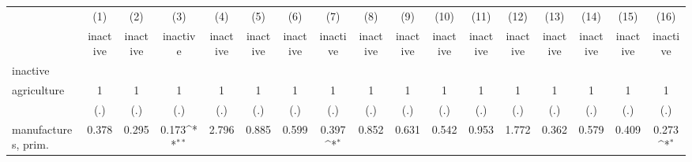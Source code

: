 {
\def\sym#1{\ifmmode^{#1}\else\(^{#1}\)\fi}
\begin{tabular}{l*{16}{c}}
\hline\hline
                    &\multicolumn{1}{c}{(1)}&\multicolumn{1}{c}{(2)}&\multicolumn{1}{c}{(3)}&\multicolumn{1}{c}{(4)}&\multicolumn{1}{c}{(5)}&\multicolumn{1}{c}{(6)}&\multicolumn{1}{c}{(7)}&\multicolumn{1}{c}{(8)}&\multicolumn{1}{c}{(9)}&\multicolumn{1}{c}{(10)}&\multicolumn{1}{c}{(11)}&\multicolumn{1}{c}{(12)}&\multicolumn{1}{c}{(13)}&\multicolumn{1}{c}{(14)}&\multicolumn{1}{c}{(15)}&\multicolumn{1}{c}{(16)}\\
                    &\multicolumn{1}{c}{inactive}&\multicolumn{1}{c}{inactive}&\multicolumn{1}{c}{inactive}&\multicolumn{1}{c}{inactive}&\multicolumn{1}{c}{inactive}&\multicolumn{1}{c}{inactive}&\multicolumn{1}{c}{inactive}&\multicolumn{1}{c}{inactive}&\multicolumn{1}{c}{inactive}&\multicolumn{1}{c}{inactive}&\multicolumn{1}{c}{inactive}&\multicolumn{1}{c}{inactive}&\multicolumn{1}{c}{inactive}&\multicolumn{1}{c}{inactive}&\multicolumn{1}{c}{inactive}&\multicolumn{1}{c}{inactive}\\
\hline
inactive            &                     &                     &                     &                     &                     &                     &                     &                     &                     &                     &                     &                     &                     &                     &                     &                     \\
agriculture         &           1         &           1         &           1         &           1         &           1         &           1         &           1         &           1         &           1         &           1         &           1         &           1         &           1         &           1         &           1         &           1         \\
                    &         (.)         &         (.)         &         (.)         &         (.)         &         (.)         &         (.)         &         (.)         &         (.)         &         (.)         &         (.)         &         (.)         &         (.)         &         (.)         &         (.)         &         (.)         &         (.)         \\
[1em]
manufactures, prim. &       0.378         &       0.295         &       0.173\sym{**} &       2.796         &       0.885         &       0.599         &       0.397\sym{*}  &       0.852         &       0.631         &       0.542         &       0.953         &       1.772         &       0.362         &       0.579         &       0.409         &       0.273\sym{*}  \\

\end{tabular}}
